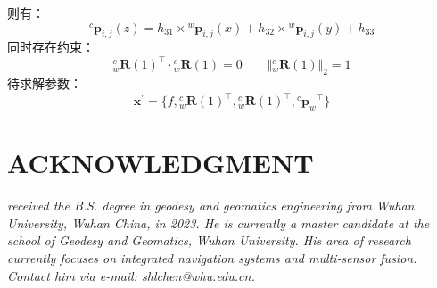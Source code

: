 \documentclass[12pt, onecolumn]{article}
\begin{document}
	则有：
	\begin{equation}
	{^c\boldsymbol{p}_{i,j}}(z)=h_{31}\times{^w\boldsymbol{p}_{i,j}}(x)+h_{32}\times{^w\boldsymbol{p}_{i,j}}(y)+h_{33}
	\end{equation}
	同时存在约束：
	\begin{equation}
	{^{c}_{w}\boldsymbol{R}(1)}^\top\cdot{^{c}_{w}\boldsymbol{R}(1)}=0
	\qquad
	\Vert{^{c}_{w}\boldsymbol{R}(1)}\Vert_2=1
	\end{equation}
	待求解参数：
	\begin{equation}
	\boldsymbol{x}^\prime=\{f,{^{c}_{w}\boldsymbol{R}(1)}^\top,{^{c}_{w}\boldsymbol{R}(1)}^\top,{^c\boldsymbol{p}_{w}}^\top\}
	\end{equation}
	
	\newpage
	
	
		
	\newpage
	\section*{ACKNOWLEDGMENT}
	\begin{tcolorbox}[colback=white,colframe=white!70!black,title={\bfseries Author Information}]
	\par\noindent
		\parbox[t]{\linewidth}{
	 \noindent{}
	 \emph{
	 received the B.S. degree in geodesy and geomatics engineering from Wuhan University, Wuhan China, in 2023.
	 He is currently a master candidate at the school of Geodesy and Geomatics, Wuhan University. His area of research currently focuses on integrated navigation systems and multi-sensor fusion.
	 Contact him via e-mail: shlchen@whu.edu.cn.
	 }}
	\end{tcolorbox}
		
		
\end{document}
